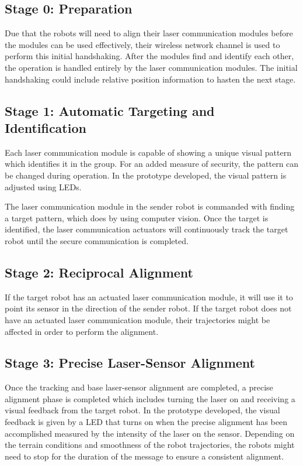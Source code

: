 \documentclass[botnum, fleqn]{unmeethesis}
\begin{document}
\subsection*{Stage 0: Preparation}

Due that the robots will need to align their laser communication modules before the modules can be used effectively, their wireless network channel is used to perform this initial handshaking. After the modules find and identify each other, the operation is handled entirely by the laser communication modules. The initial handshaking could include relative position information to hasten the next stage.

\subsection*{Stage 1: Automatic Targeting and Identification}

Each laser communication module is capable of showing a unique visual pattern which identifies it in the group. For an added measure of security, the pattern can be changed during operation. In the prototype developed, the visual pattern is adjusted using LEDs.

The laser communication module in the sender robot is commanded with finding a target pattern, which does by using computer vision. Once the target is identified, the laser communication actuators will continuously track the target robot until the secure communication is completed. 

\subsection*{Stage 2: Reciprocal Alignment}

If the target robot has an actuated laser communication module, it will use it to point its sensor in the direction of the sender robot. If the target robot does not have an actuated laser communication module, their trajectories might be affected in order to perform the alignment. 

\subsection*{Stage 3: Precise Laser-Sensor Alignment}

Once the tracking and base laser-sensor alignment are completed, a precise alignment phase is completed which includes turning the laser on and receiving a visual feedback from the target robot. In the prototype developed, the visual feedback is given by a LED that turns on when the precise alignment has been accomplished measured by the intensity of the laser on the sensor. Depending on the terrain conditions and smoothness of the robot trajectories, the robots might need to stop for the duration of the message to ensure a consistent alignment.
\end{document}
